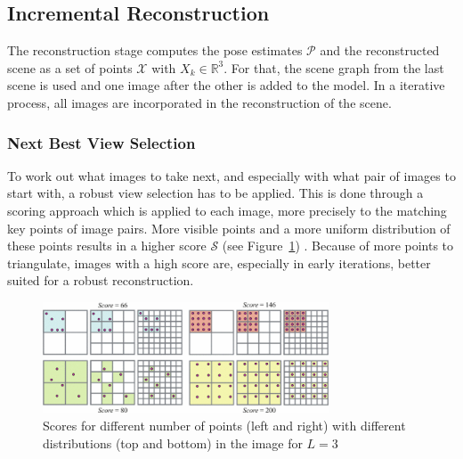\documentclass[conference,]{IEEEtran}
\begin{document}
\hypertarget{incremental-reconstruction}{%
\subsection{Incremental
Reconstruction}\label{incremental-reconstruction}}

The reconstruction stage computes the pose estimates \(\mathcal{P}\) and
the reconstructed scene as a set of points \(\mathcal{X}\) with
\(X_k\in\mathbb{R}^3\). For that, the scene graph from the last scene is
used and one image after the other is added to the model. In a iterative
process, all images are incorporated in the reconstruction of the scene.
\autocite{schönberger2016}

\hypertarget{next-best-view-selection}{%
\subsubsection{Next Best View
Selection}\label{next-best-view-selection}}

To work out what images to take next, and especially with what pair of
images to start with, a robust view selection has to be applied. This is
done through a scoring approach which is applied to each image, more
precisely to the matching key points of image pairs. More visible points
and a more uniform distribution of these points results in a higher
score \(\mathcal{S}\) (see Figure~\ref{fig-BestViewSelection})
\autocite{irschara2009}. Because of more points to triangulate, images
with a high score are, especially in early iterations, better suited for
a robust reconstruction.

\begin{figure}

{\centering \includegraphics[width=8.5cm,height=3.3cm]{images/BestViewSelection.png}

}

\caption{\label{fig-BestViewSelection}Scores for different number of
points (left and right) with different distributions (top and bottom) in
the image for \(L=3\) \autocite{schönberger2016}}

\end{figure}
\end{document}
